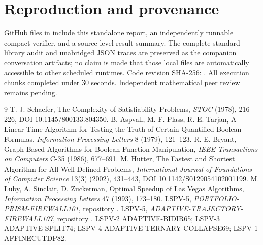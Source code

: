 \documentclass[11pt]{article}
\begin{document}
\section{Reproduction and provenance}
GitHub files in  include this standalone report, an independently runnable compact verifier, and a source-level result summary. The complete standard-library audit and unabridged JSON traces are preserved as the companion conversation artifacts; no claim is made that those local files are automatically accessible to other scheduled runtimes. Code revision SHA-256: . All execution chunks completed under 30 seconds. Independent mathematical peer review remains pending.

\begin{thebibliography}{9}
 T. J. Schaefer, The Complexity of Satisfiability Problems, \emph{STOC} (1978), 216--226, DOI 10.1145/800133.804350.
 B. Aspvall, M. F. Plass, R. E. Tarjan, A Linear-Time Algorithm for Testing the Truth of Certain Quantified Boolean Formulas, \emph{Information Processing Letters} 8 (1979), 121--123.
 R. E. Bryant, Graph-Based Algorithms for Boolean Function Manipulation, \emph{IEEE Transactions on Computers} C-35 (1986), 677--691.
 M. Hutter, The Fastest and Shortest Algorithm for All Well-Defined Problems, \emph{International Journal of Foundations of Computer Science} 13(3) (2002), 431--443, DOI 10.1142/S0129054102001199.
 M. Luby, A. Sinclair, D. Zuckerman, Optimal Speedup of Las Vegas Algorithms, \emph{Information Processing Letters} 47 (1993), 173--180.
 LSPV-5, \emph{PORTFOLIO-PRISM-FIREWALL101}, repository .
 LSPV-5, \emph{ADAPTIVE-TRAJECTORY-FIREWALL107}, repository .
 LSPV-2 ADAPTIVE-BIDIR65; LSPV-3 ADAPTIVE-SPLIT74; LSPV-4 ADAPTIVE-TERNARY-COLLAPSE69; LSPV-1 AFFINECUTDP82.
\end{thebibliography}
\end{document}
